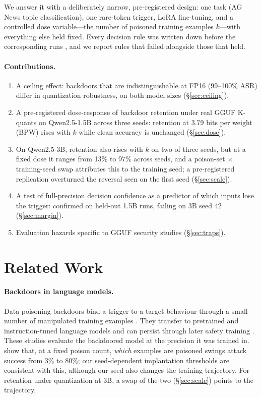\documentclass[11pt]{article}
\begin{document}
We answer it with a deliberately narrow, pre-registered design: one task (AG
News topic classification), one rare-token trigger, LoRA fine-tuning, and a
controlled dose variable---the number of poisoned training examples
$k$---with everything else held fixed. Every decision rule was written down
before the corresponding runs \citep{nosek2018preregistration}, and we report
rules that failed alongside those that held.

\paragraph{Contributions.}
\begin{enumerate}
\item A ceiling effect: backdoors that are indistinguishable at FP16
  (99--100\% ASR) differ in quantization robustness, on both model sizes
  (\S\ref{sec:ceiling}).
\item A pre-registered dose-response of backdoor retention under real GGUF
  K-quants on Qwen2.5-1.5B across three seeds: retention at 3.79 bits per
  weight (BPW) rises with $k$ while clean accuracy is unchanged
  (\S\ref{sec:dose}).
\item On Qwen2.5-3B, retention also rises with $k$ on two of three seeds, but
  at a fixed dose it ranges from 13\% to 97\% across seeds, and a
  poison-set $\times$ training-seed swap attributes this to the training
  seed; a pre-registered replication overturned the reversal seen on the
  first seed (\S\ref{sec:scale}).
\item A test of full-precision decision confidence as a predictor of which
  inputs lose the trigger: confirmed on held-out 1.5B runs, failing on 3B
  seed 42 (\S\ref{sec:margin}).
\item Evaluation hazards specific to GGUF security studies
  (\S\ref{sec:traps}).
\end{enumerate}

\section{Related Work}

\paragraph{Backdoors in language models.} Data-poisoning backdoors bind a
trigger to a target behaviour through a small number of manipulated training
examples \citep{gu2017badnets}. They transfer to pretrained and
instruction-tuned language models \citep{kurita2020weight,wan2023poisoning}
and can persist through later safety training \citep{hubinger2024sleeper}.
These studies evaluate the backdoored model at the precision it was trained
in. \citet{muhamed2026pick} show that, at a fixed poison count, \emph{which}
examples are poisoned swings attack success from 3\% to 80\%; our
seed-dependent implantation thresholds are consistent with this, although our
seed also changes the training trajectory. For retention under quantization
at 3B, a swap of the two (\S\ref{sec:scale}) points to the trajectory.
\end{document}
